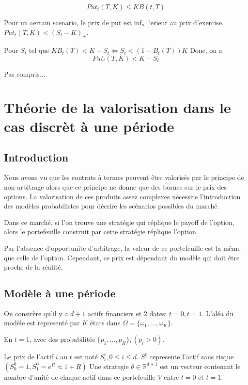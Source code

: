 \documentclass{article}
\theoremstyle{plain}
\theoremstyle{definition}
\begin{document}
\begin{equation}
Put_t(T, K) \leq KB(t, T)
\end{equation}

Pour un certain scenario, le prix de put est inf、‘erieur au prix d'exercise. $Put_t(T, K)<(S_t-K)_+$.

Pour $S_t$ tel que $KB_t(T)< K-S_t \Leftrightarrow S_t < (1-B_t(T))K$
Donc, on a
\begin{equation}
Put_t(T, K)< K-S_t
\end{equation} 

{\color{red} Pas compris...}

\section{Th\'eorie de la valorisation dans le cas discr\`et \`a une p\'eriode}

\subsection{Introduction}
Nous avons vu que les contrats \`a termes peuvent \^{e}tre valoris\'es par le principe de non-arbitrage alors que ce principe ne donne que des bornes sur le prix des options. La valorisation de ces produits assez complexes n\'ecessite l'introduction des mod\`eles probabilistes pour d\'ecrire les sc\'enarios possibles du march\'e.

Dans ce march\'e, si l'on trouve une strat\'egie qui r\'eplique le payoff de l'option, alors le portefeuille construit par cette strat\'egie r\'eplique l'option.

Par l'absence d'opportunite d'arbitrage, la valeur de ce portefeuille est la m\^{e}me que celle de l'option. Cependant, ce prix est d\'ependant du mod\`ele qui doit \^etre proche de la r\'ealit\'e.

\subsection{Mod\`ele \`a une p\'eriode}

On consir\`ere qu'il y a $d+1$ actifs financiers et $2$ dates: $t=0, t=1$. L'al\'ea du mod\`ele est represent\'e par $K$ \'etats dans $\Omega=\{\omega_1,\ldots,\omega_K\}$.

En $t=1$, avec des probabilit\'es $ \{p_1,\ldots,p_K\},(p_i>0) $.

Le prix de l'actif $i$ au $t$ est not\'e $S_t^i, 0\leq i\leq d$. $S^0$ represente l'actif sans risque $(S_0^0=1, S_1^0=e^R\approx 1+R)$
Une strategie $\theta\in\mathbb{R}^{d+1}$ est un vecteur contenant le nombre d'unit\'e de chaque actif dans ce portefeuille $V$ entre $t=0$ et $t=1$. 
\end{document}
